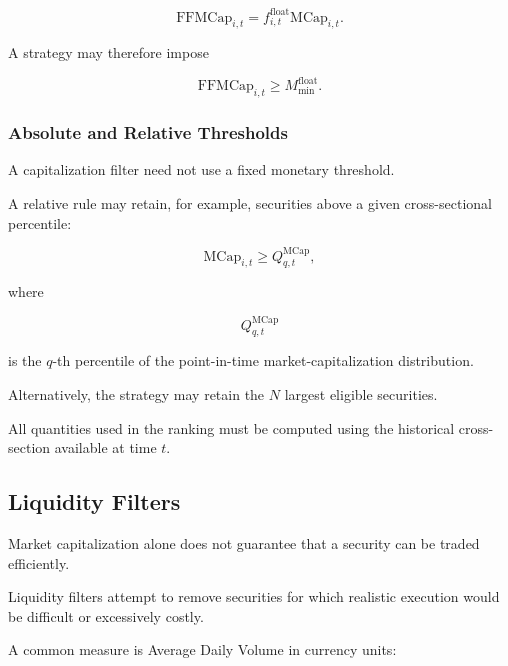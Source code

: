 \documentclass[11pt,a4paper]{article}
\begin{document}
\begin{equation}
\boxed{
\mathrm{FFMCap}_{i,t}
=
f_{i,t}^{\mathrm{float}}
\mathrm{MCap}_{i,t}.
}
\end{equation}

A strategy may therefore impose

\begin{equation}
\mathrm{FFMCap}_{i,t}
\geq
M_{\min}^{\mathrm{float}}.
\end{equation}


\subsubsection{Absolute and Relative Thresholds}

A capitalization filter need not use a fixed monetary threshold.

A relative rule may retain, for example, securities above a given
cross-sectional percentile:

\begin{equation}
\mathrm{MCap}_{i,t}
\geq
Q_{q,t}^{\mathrm{MCap}},
\end{equation}

where

\begin{equation}
Q_{q,t}^{\mathrm{MCap}}
\end{equation}

is the $q$-th percentile of the point-in-time market-capitalization
distribution.

Alternatively, the strategy may retain the $N$ largest eligible securities.

All quantities used in the ranking must be computed using the historical
cross-section available at time $t$.


\subsection{Liquidity Filters}
\label{subsec:liquidity_filters}

Market capitalization alone does not guarantee that a security can be traded
efficiently.

Liquidity filters attempt to remove securities for which realistic execution
would be difficult or excessively costly.

A common measure is Average Daily Volume in currency units:
\end{document}
